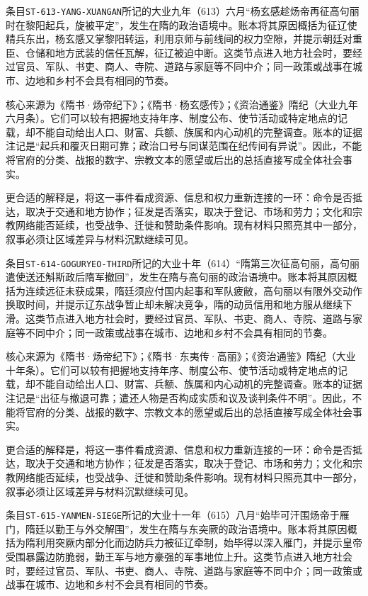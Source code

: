 条目\texttt{ST-613-YANG-XUANGAN}所记的大业九年（613）六月“杨玄感趁炀帝再征高句丽时在黎阳起兵，旋被平定”，发生在隋的政治语境中。账本将其原因概括为征辽使精兵东出，杨玄感又掌黎阳转运，利用京师与前线间的权力空隙，并提示朝廷对重臣、仓储和地方武装的信任瓦解，征辽被迫中断。这类节点进入地方社会时，要经过官员、军队、书吏、商人、寺院、道路与家庭等不同中介；同一政策或战事在城市、边地和乡村不会具有相同的节奏。

核心来源为《隋书·炀帝纪下》；《隋书·杨玄感传》；《资治通鉴》隋纪（大业九年六月条）。它们可以较有把握地支持年序、制度公布、使节活动或特定地点的记载，却不能自动给出人口、财富、兵额、族属和内心动机的完整调查。账本的证据注记是“起兵和覆灭日期可靠；政治口号与同谋范围在纪传间有异说”。因此，不能将官府的分类、战报的数字、宗教文本的愿望或后出的总括直接写成全体社会事实。

更合适的解释是，将这一事件看成资源、信息和权力重新连接的一环：命令是否抵达，取决于交通和地方协作；征发是否落实，取决于登记、市场和劳力；文化和宗教网络能否延续，也受战争、迁徙和赞助条件影响。现有材料只照亮其中一部分，叙事必须让区域差异与材料沉默继续可见。

条目\texttt{ST-614-GOGURYEO-THIRD}所记的大业十年（614）“隋第三次征高句丽，高句丽遣使送还斛斯政后隋军撤回”，发生在隋与高句丽的政治语境中。账本将其原因概括为连续远征未获成果，隋廷须应付国内起事和军队疲敝，高句丽以有限外交动作换取时间，并提示辽东战争暂止却未解决竞争，隋的动员信用和地方服从继续下滑。这类节点进入地方社会时，要经过官员、军队、书吏、商人、寺院、道路与家庭等不同中介；同一政策或战事在城市、边地和乡村不会具有相同的节奏。

核心来源为《隋书·炀帝纪下》；《隋书·东夷传·高丽》；《资治通鉴》隋纪（大业十年条）。它们可以较有把握地支持年序、制度公布、使节活动或特定地点的记载，却不能自动给出人口、财富、兵额、族属和内心动机的完整调查。账本的证据注记是“出征与撤退可靠；遣还人物是否构成实质和议及谈判条件不明”。因此，不能将官府的分类、战报的数字、宗教文本的愿望或后出的总括直接写成全体社会事实。

更合适的解释是，将这一事件看成资源、信息和权力重新连接的一环：命令是否抵达，取决于交通和地方协作；征发是否落实，取决于登记、市场和劳力；文化和宗教网络能否延续，也受战争、迁徙和赞助条件影响。现有材料只照亮其中一部分，叙事必须让区域差异与材料沉默继续可见。

条目\texttt{ST-615-YANMEN-SIEGE}所记的大业十一年（615）八月“始毕可汗围炀帝于雁门，隋廷以勤王与外交解围”，发生在隋与东突厥的政治语境中。账本将其原因概括为隋利用突厥内部分化而边防兵力被征辽牵制，始毕得以深入雁门，并提示皇帝受围暴露边防脆弱，勤王军与地方豪强的军事地位上升。这类节点进入地方社会时，要经过官员、军队、书吏、商人、寺院、道路与家庭等不同中介；同一政策或战事在城市、边地和乡村不会具有相同的节奏。

